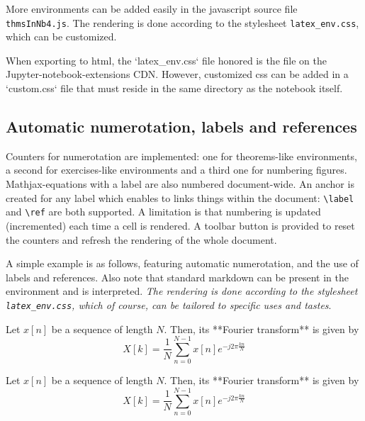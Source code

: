 \documentclass[11pt]{article}
\begin{document}
More environments can be added easily in the javascript source file
\texttt{thmsInNb4.js}. The rendering is done according to the stylesheet
\texttt{latex\_env.css}, which can be customized.

\begin{remark}
When exporting to html, the `latex_env.css` file honored is the file on the Jupyter-notebook-extensions CDN. However, customized css can be added in a `custom.css` file that must reside in the same directory as the notebook itself. 
\end{remark}

    \subsection{Automatic numerotation, labels and
references}\label{automatic-numerotation-labels-and-references}

    Counters for numerotation are implemented: one for theorems-like
environments, a second for exercises-like environments and a third one
for numbering figures.\\
Mathjax-equations with a label are also numbered document-wide. An
anchor is created for any label which enables to links things within the
document: \texttt{\textbackslash{}label} and
\texttt{\textbackslash{}ref} are both supported. A limitation is that
numbering is updated (incremented) each time a cell is rendered. A
toolbar button is provided to reset the counters and refresh the
rendering of the whole document.

    \label{example:mixing} A simple example is as follows, featuring
automatic numerotation, and the use of labels and references. Also note
that standard markdown can be present in the environment and is
interpreted. \emph{The rendering is done according to the stylesheet
\texttt{latex\_env.css}, which of course, can be tailored to specific
uses and tastes}.

\begin{listing}
\begin{definition} \label{def:FT}
Let $x[n]$ be a sequence of length $N$. Then, its **Fourier transform** is given by
\begin{equation}
\label{eq:FT}
X[k]= \frac{1}{N} \sum_{n=0}^{N-1} x[n] e^{-j2\pi \frac{kn}{N}}
\end{equation}
\end{definition}
\end{listing}

    \begin{definition} \label{def:FT}
Let $x[n]$ be a sequence of length $N$. Then, its **Fourier transform** is given by
\begin{equation}
\label{eq:FT2}
X[k]= \frac{1}{N} \sum_{n=0}^{N-1} x[n] e^{-j2\pi \frac{kn}{N}}
\end{equation}
\end{definition}
\end{document}
